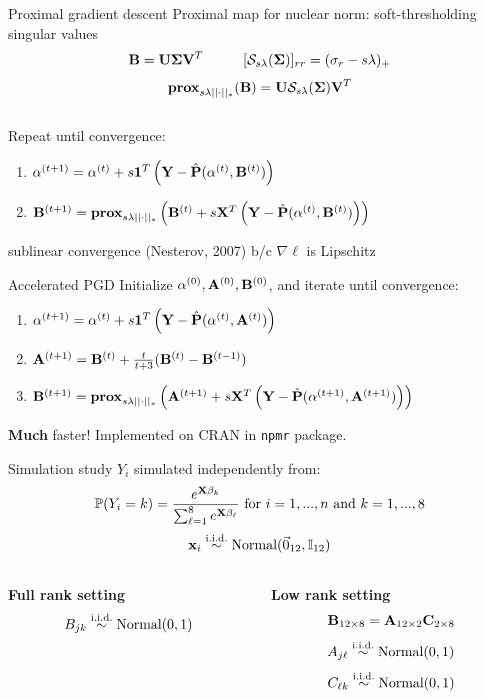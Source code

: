 \documentclass[handout]{beamer}
\def\bA{{\bf A}}\def\bB{{\bf B}}\def\bC{{\bf C}}\def\bE{{\bf E}}\def\bP{{\bf P}}
\def\bU{{\bf U}}\def\bV{{\bf V}}\def\bX{{\bf X}}\def\bY{{\bf Y}}
\def\l{\left}\def\r{\right}\def\lf{\lfloor}\def\rf{\rfloor}
\def\iid{\stackrel{\mbox{\scriptsize i.i.d.}}{\sim}}
\begin{document}
\begin{frame}{Proximal gradient descent}
Proximal map for nuclear norm: soft-thresholding singular values
$$\bB = \bU\bSigma\bV^T \hspace{1cm} [\mathcal S_{s\lambda}(\bSigma)]_{rr} =
    (\sigma_r - s\lambda)_+$$
$${\bf prox}_{s\lambda||\cdot||_*}(\bB) =
    \bU{\mathcal S_{s\lambda}(\bSigma)}\bV^T$$
\vspace{4mm}\\
\pause
Repeat until convergence:
\begin{enumerate}
    \item $\alpha^{(t+1)} = \alpha^{(t)} + s{\bf1}^T\l(\bY -
      \hat\bP(\alpha^{(t)}, \bB^{(t)})\r)$
    \item $\bB^{(t+1)} = {\bf prox}_{s\lambda||\cdot||_*}\l(\bB^{(t)} +
      s\bX^T\l(\bY - \hat\bP(\alpha^{(t)}, \bB^{(t)})\r)\r)$
\end{enumerate}
\vspace{4mm}
sublinear convergence (Nesterov, 2007) b/c $\nabla\ell$ is Lipschitz
\end{frame}

\begin{frame}{Accelerated PGD}
Initialize $\alpha^{(0)}, \bA^{(0)}, \bB^{(0)}$, and iterate until convergence:
\begin{enumerate}
    \item $\alpha^{(t+1)} = \alpha^{(t)} +
      s{\bf1}^T\l(\bY - \hat\bP(\alpha^{(t)}, \bA^{(t)})\r)$
    \item {\color{ricerichblue} $\bA^{(t+1)} = \bB^{(t)} + \frac t{t+3}(\bB^{(t)} - \bB^{(t-1)})$}
    \item $\bB^{(t+1)} = {\bf prox}_{s\lambda||\cdot||_*}\l(\bA^{(t+1)} +
      s\bX^T\l(\bY - \hat\bP(\alpha^{(t+1)}, \bA^{(t+1)})\r)\r)$
\end{enumerate}
\vspace{4mm}
{\bf Much} faster! Implemented on CRAN in {\tt npmr} package.
\end{frame}

\begin{frame}{Simulation study}
  $Y_i$ simulated independently from:
  $$\mP(Y_i = k) = \frac{e^{\bX\beta_k}}
      {\sum_{\ell=1}^8e^{\bX\beta_\ell}}\mbox{ for }i = 1, ..., n\mbox{ and }
      k = 1, ..., 8$$
  $$\bx_i \iid \mbox{Normal}(\vec 0_{12}, \mI_{12})$$
  \begin{columns}
    \begin{column}{.5\textwidth}
      \centering
      {\bf Full rank setting}
      $$B_{jk} \iid \mbox{Normal}(0, 1)$$
      $$~$$
      $$~$$
    \end{column}
    \begin{column}{.5\textwidth}
      \centering
      {\bf Low rank setting}
      $$\bB_{12\times8} = \bA_{12\times2}\bC_{2\times8}$$
      $$A_{j\ell} \iid \mbox{Normal}(0, 1)$$
      $$C_{\ell k} \iid \mbox{Normal}(0, 1)$$
    \end{column}
  \end{columns}
\end{frame}
\end{document}

